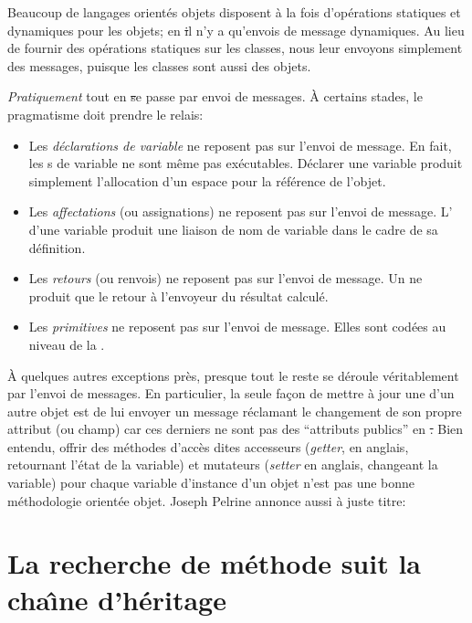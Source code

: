 \documentclass[a4paper,10pt,twoside]{book}
\begin{document}
Beaucoup de langages orient\'es objets disposent \`a la fois d'op\'erations statiques et dynamiques pour les objets; en \st il n'y a qu'envois de message dynamiques. Au lieu de fournir des op\'erations statiques sur les classes, nous leur envoyons simplement des messages, puisque les classes sont aussi des objets. 

\emph{Pratiquement} tout en \st se passe par envoi de messages.
\`A certains stades, le pragmatisme doit prendre le relais:
\begin{itemize}
  \item Les \emph{d\'eclarations de variable} ne reposent pas sur l'envoi de message.
  		En fait, les s de variable ne sont m\^eme pas ex\'ecutables.
  		D\'eclarer une variable produit simplement l'allocation d'un espace pour la r\'ef\'erence de l'objet.
  \item Les \emph{affectations} (ou assignations) ne reposent pas sur l'envoi de message.
  		L' d'une variable produit une liaison de nom de variable dans le cadre de sa d\'efinition.
  \item Les \emph{retours} (ou renvois) ne reposent pas sur l'envoi de message.
  		Un  ne produit que le retour \`a l'envoyeur du r\'esultat calcul\'e.
  \item Les \emph{primitives} ne reposent pas sur l'envoi de message.
  		Elles sont cod\'ees au niveau de la .
\end{itemize}

\`A quelques autres exceptions pr\`es, presque tout le reste se d\'eroule v\'eritablement par l'envoi de messages. 
En particulier, la seule fa\c{c}on de mettre \`a jour une  d'un autre objet est de lui envoyer un message r\'eclamant le changement de son propre attribut (ou champ) car ces derniers ne sont pas des ``attributs publics'' en \st.
Bien entendu, offrir des m\'ethodes d'acc\`es dites accesseurs (\emph{getter}, en anglais, retournant l'\'etat de la variable) et mutateurs (\emph{setter} en anglais, changeant la variable) pour chaque variable d'instance d'un objet n'est pas une bonne m\'ethodologie orient\'ee objet.
Joseph Pelrine annonce aussi \`a juste titre:

\section{La recherche de m\'ethode suit la cha\^{\i}ne d'h\'eritage} 
\end{document}
